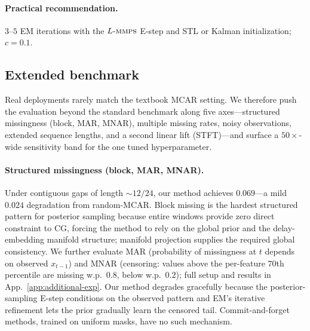 \documentclass{article}
\theoremstyle{plain}
\theoremstyle{definition}
\theoremstyle{remark}
\newcommand{\lmmps}{L\mbox{-}\textsc{mmps}}
\begin{document}
\paragraph{Practical recommendation.}
$3$--$5$ EM iterations with the $\lmmps$ E-step and STL or Kalman initialization; $c = 0.1$.

\vspace{-1mm}
\subsection{Extended benchmark}
\label{sec:extended}
\vspace{-1mm}

Real deployments rarely match the textbook MCAR setting. We therefore push the evaluation beyond the standard benchmark along five axes---structured missingness (block, MAR, MNAR), multiple missing rates, noisy observations, extended sequence lengths, and a second linear lift (STFT)---and surface a $50\times$-wide sensitivity band for the one tuned hyperparameter.

\begin{table}
\vspace{-3mm}
\centering
\caption{Disc.\ score under block missing and non-MCAR mechanisms on Energy, $50\%$ rate.}
\label{tab:patterns}
\vspace{-3mm}
\end{table}

\paragraph{Structured missingness (block, MAR, MNAR).}
Under contiguous gaps of length ${\sim}12/24$, our method achieves $0.069$---a mild $0.024$ degradation from random-MCAR. Block missing is the hardest structured pattern for posterior sampling because entire windows provide zero direct constraint to CG, forcing the method to rely on the global prior and the delay-embedding manifold structure; manifold projection supplies the required global consistency. We further evaluate MAR (probability of missingness at $t$ depends on observed $x_{t-1}$) and MNAR (censoring: values above the per-feature $70$th percentile are missing w.p.\ $0.8$, below w.p.\ $0.2$); full setup and results in App.~\ref{app:additional-exp}. Our method degrades gracefully because the posterior-sampling E-step conditions on the observed pattern and EM's iterative refinement lets the prior gradually learn the censored tail. Commit-and-forget methods, trained on uniform masks, have no such mechanism.
\end{document}
